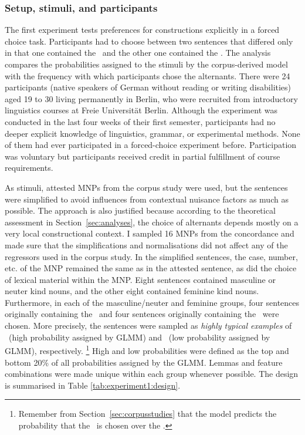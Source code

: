 \subsubsection{Setup, stimuli, and participants}

The first experiment tests preferences for constructions explicitly in a forced choice task.
Participants had to choose between two sentences that differed only in that one contained the \NACa\, and the other one contained the \PGCa.
The analysis compares the probabilities assigned to the stimuli by the corpus-derived model with the frequency with which participants chose the alternants.
There were 24 participants (native speakers of German without reading or writing disabilities) aged 19 to 30 living permanently in Berlin, who were recruited from introductory linguistics courses at Freie Universität Berlin.
Although the experiment was conducted in the last four weeks of their first semester, participants had no deeper explicit knowledge of linguistics, grammar, or experimental methods.
None of them had ever participated in a forced-choice experiment before.
Participation was voluntary but participants received credit in partial fulfillment of course requirements.

As stimuli, attested MNPs from the corpus study were used, but the sentences were simplified to avoid influences from contextual nuisance factors as much as possible.
The approach is also justified because according to the theoretical assessment in Section~\ref{sec:analyses}, the choice of alternants depends mostly on a very local constructional context.
I sampled 16 MNPs from the concordance and made sure that the simplifications and normalisations did not affect any of the regressors used in the corpus study.
In the simplified sentences, the case, number, etc. of the MNP remained the same as in the attested sentence, as did the choice of lexical material within the MNP.
Eight sentences contained masculine or neuter kind nouns, and the other eight contained feminine kind nouns.
Furthermore, in each of the masculine\slash neuter and feminine groups, four sentences originally containing the \NACa\ and four sentences originally containing the \PGCa\ were chosen.
More precisely, the sentences were sampled as \textit{highly typical examples} of \PGCa\ (high probability assigned by GLMM) and \NACa\ (low probability assigned by GLMM), respectively.%
\footnote{Remember from Section~\ref{sec:corpusstudies} that the model predicts the probability that the \PGCa\ is chosen over the \NACa.}
High and low probabilities were defined as the top and bottom 20\% of all probabilities assigned by the GLMM.
Lemmas and feature combinations were made unique within each group whenever possible.
The design is summarised in Table \ref{tab:experiment1:design}.


